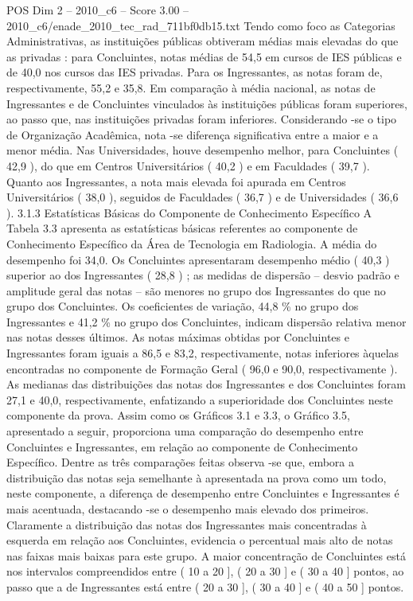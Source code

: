 \begin{textsample}{POS Dim 2 – 2010\_c6 – Score 3.00 – 2010\_c6/enade\_2010\_tec\_rad\_711bf0db15.txt}
Tendo como foco as Categorias Administrativas, as instituições públicas obtiveram médias mais elevadas do que as privadas : para Concluintes, notas médias de 54,5 em cursos de IES públicas e de 40,0 nos cursos das IES privadas.
Para os Ingressantes, as notas foram de, respectivamente, 55,2 e 35,8.
Em comparação à média nacional, as notas de Ingressantes e de Concluintes vinculados às instituições públicas foram superiores, ao passo que, nas instituições privadas foram inferiores.
Considerando -se o tipo de Organização Acadêmica, nota -se diferença significativa entre a maior e a menor média.
Nas Universidades, houve desempenho melhor, para Concluintes ( 42,9 ), do que em Centros Universitários ( 40,2 ) e em Faculdades ( 39,7 ).
Quanto aos Ingressantes, a nota mais elevada foi apurada em Centros Universitários ( 38,0 ), seguidos de Faculdades ( 36,7 ) e de Universidades ( 36,6 ). 3.1.3 Estatísticas Básicas do Componente de Conhecimento Específico A Tabela 3.3 apresenta as estatísticas básicas referentes ao componente de Conhecimento Específico da Área de Tecnologia em Radiologia.
A média do desempenho foi 34,0.
Os Concluintes apresentaram desempenho médio ( 40,3 ) superior ao dos Ingressantes ( 28,8 ) ; as medidas de dispersão – desvio padrão e amplitude geral das notas – são menores no grupo dos Ingressantes do que no grupo dos Concluintes.
Os coeficientes de variação, 44,8 \% no grupo dos Ingressantes e 41,2 \% no grupo dos Concluintes, indicam dispersão relativa menor nas notas desses últimos.
As notas máximas obtidas por Concluintes e Ingressantes foram iguais a 86,5 e 83,2, respectivamente, notas inferiores àquelas encontradas no componente de Formação Geral ( 96,0 e 90,0, respectivamente ).
As medianas das distribuições das notas dos Ingressantes e dos Concluintes foram 27,1 e 40,0, respectivamente, enfatizando a superioridade dos Concluintes neste componente da prova.
Assim como os Gráficos 3.1 e 3.3, o Gráfico 3.5, apresentado a seguir, proporciona uma comparação do desempenho entre Concluintes e Ingressantes, em relação ao componente de Conhecimento Específico.
Dentre as três comparações feitas observa -se que, embora a distribuição das notas seja semelhante à apresentada na prova como um todo, neste componente, a diferença de desempenho entre Concluintes e Ingressantes é mais acentuada, destacando -se o desempenho mais elevado dos primeiros.
Claramente a distribuição das notas dos Ingressantes mais concentradas à esquerda em relação aos Concluintes, evidencia o percentual mais alto de notas nas faixas mais baixas para este grupo.
A maior concentração de Concluintes está nos intervalos compreendidos entre ( 10 a 20 ], ( 20 a 30 ] e ( 30 a 40 ] pontos, ao passo que a de Ingressantes está entre ( 20 a 30 ], ( 30 a 40 ] e ( 40 a 50 ] pontos.

\end{textsample}

